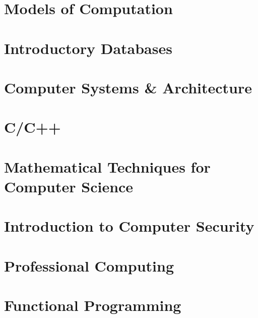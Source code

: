 \documentclass[12pt, a4paper, oneside, titlepage]{report}
\begin{document}
\chapter{Models of Computation}

\chapter{Introductory Databases}

\chapter{Computer Systems \& Architecture}

\chapter{C/C++}

\chapter{Mathematical Techniques for Computer Science}

\chapter{Introduction to Computer Security}

\chapter{Professional Computing}

\chapter{Functional Programming}

\end{document}
